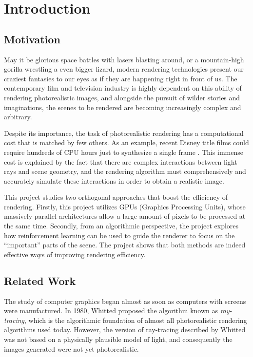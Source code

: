 \chapter{Introduction}

\section{Motivation}
May it be glorious space battles with lasers blasting around, or a mountain-high gorilla wrestling a even bigger lizard, modern rendering technologies present our craziest fantasies to our eyes as if they are happening right in front of us. The contemporary film and television industry is highly dependent on this ability of rendering photorealistic images, and alongside the pursuit of wilder stories and imaginations, the scenes to be rendered are becoming increasingly complex and arbitrary.

Despite its importance, the task of photorealistic rendering has a computational cost that is matched by few others. As an example, recent Disney title films could require hundreds of CPU hours just to synthesize a single frame \cite{hyperion}. This immense cost is explained by the fact that there are complex interactions between light rays and scene geometry, and the rendering algorithm must comprehensively and accurately simulate these interactions in order to obtain a realistic image. 

This project studies two orthogonal approaches that boost the efficiency of rendering. Firstly, this project utilizes GPUs (Graphics Processing Units), whose massively parallel architectures allow a large amount of pixels to be processed at the same time. Secondly, from an algorithmic perspective, the project explores how reinforcement learning can be used to guide the renderer to focus on the ``important'' parts of the scene. The project shows that both methods are indeed effective ways of improving rendering efficiency.

\section{Related Work}

The study of computer graphics began almost as soon as computers with screens were manufactured. In 1980, Whitted \cite{whitted} proposed the algorithm known as \textit{ray-tracing}, which is the algorithmic foundation of almost all photorealistic rendering algorithms used today. However, the version of ray-tracing described by Whitted was not based on a physically plausible model of light, and consequently the images generated were not yet photorealistic. 

